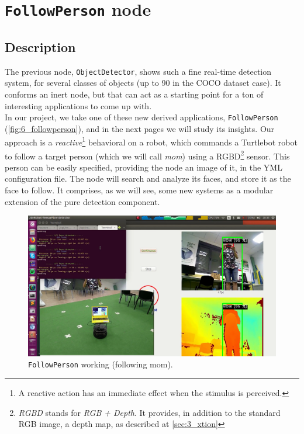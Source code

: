 \chapter{\texttt{FollowPerson} node}
\label{chap:followperson}
\section{Description}
	The previous node, \texttt{ObjectDetector}, shows such a fine real-time detection system, for several classes of objects (up to 90 in the COCO dataset case). It conforms an inert node, but that can act as a starting point for a ton of interesting applications to come up with.\\
	
	In our project, we take one of these new derived applications, \texttt{FollowPerson} (\autoref{fig:6_followperson}), and in the next pages we will study its insights. Our approach is a \emph{reactive}\footnote{A reactive action has an immediate effect when the stimulus is perceived.} behavioral on a robot, which commands a Turtlebot robot to follow a target person (which we will call \emph{mom}) using a RGBD\footnote{\emph{RGBD} stands for \emph{RGB + Depth}. It provides, in addition to the standard RGB image, a depth map, as described at \ref{sec:3_xtion}} sensor. This person can be easily specified, providing the node an image of it, in the YML configuration file. The node will search and analyze its faces, and store it as the face to follow. It comprises, as we will see, some new systems as a modular extension of the pure detection component.
	
	\begin{figure}[h]
		\centering
		\includegraphics[width=6in]{images/followperson_working}
		\caption{\texttt{FollowPerson} working (following mom).}
		\label{fig:6_followperson}
	\end{figure}
	
